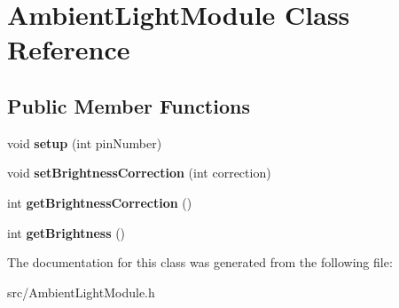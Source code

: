 \hypertarget{class_ambient_light_module}{}\section{Ambient\+Light\+Module Class Reference}
\label{class_ambient_light_module}
\subsection*{Public Member Functions}
\begin{DoxyCompactItemize}
\item 
\mbox{\label{class_ambient_light_module_a81e6f755ce07dfabe34bcb7ef61fcf41}} 
void {\bfseries setup} (int pin\+Number)
\item 
\mbox{\label{class_ambient_light_module_a1a8cce98e966888ab2f1b177835b3efe}} 
void {\bfseries set\+Brightness\+Correction} (int correction)
\item 
\mbox{\label{class_ambient_light_module_ac2b96b6eddd0b246b2b34218c282b370}} 
int {\bfseries get\+Brightness\+Correction} ()
\item 
\mbox{\label{class_ambient_light_module_ab6044dd9f3901cb45e01ae4dc0f337d8}} 
int {\bfseries get\+Brightness} ()
\end{DoxyCompactItemize}


The documentation for this class was generated from the following file\+:\begin{DoxyCompactItemize}
\item 
src/Ambient\+Light\+Module.\+h\end{DoxyCompactItemize}
